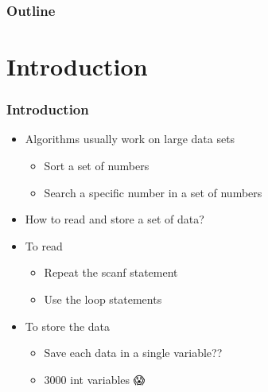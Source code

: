 \documentclass{../c-lecture}
\subtitle{Arrays}
\begin{document}
\begin{frame}
  \titlepage{}
\end{frame}
\begin{frame}
  \frametitle{Outline}
  \tableofcontents{}
\end{frame}

\section{Introduction}

\begin{frame}
  \frametitle{Introduction}
  \begin{itemize}
    \item Algorithms usually work on large data sets
    \begin{itemize}
      \item Sort a set of numbers
      \item Search a specific number in a set of numbers
    \end{itemize}
    \item How to read and store a set of data?
    \item To read
    \begin{itemize}
      \item Repeat the scanf statement
      \item Use the loop statements
    \end{itemize}
    \item To store the data
    \begin{itemize}
      \item Save each data in a single variable??
      \item 3000 int variables 😱
    \end{itemize}
  \end{itemize}
\end{frame}
\end{document}
